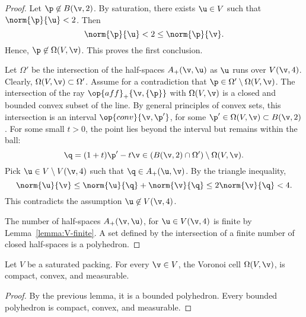 \begin{proof} Let $\p\not\in B(\v,2)$.  
By saturation, there exists $\u\in V$ such that $\norm{\p}{\u}<2$.
Then 
\begin{displaymath}
\norm{\p}{\u} < 2 \le \norm{\p}{\v}.
\end{displaymath}
Hence, $\p\not\in\Omega(V,\v)$.  This proves the first conclusion.


Let $\Omega'$ be the intersection of the half-spaces $A_+(\v,\u)$ as
$\u$ runs over $V(\v,4)$.  Clearly, $\Omega(V,\v)\subset \Omega'$.
Assume for a contradiction that $\p\in \Omega'\setminus\Omega(V,\v)$.
The intersection of the ray $\op{aff}_+\{\v,\{\p\}\}$ with
$\Omega(V,\v)$ is a closed and bounded convex subset of the line.  By
general principles of convex sets, this intersection is an interval
$\op{conv}\{\v,\p'\}$, for some $\p'\in\Omega(V,\v)\subset B(\v,2)$.
For some small $t>0$, the point lies beyond the interval but remains
within the ball:
\begin{displaymath}
\q = (1+t)\p' -t \v\in (B(\v,2)\cap \Omega')\setminus \Omega(V,\v).
\end{displaymath}
Pick $\u\in V\setminus V(\v,4)$ such that $\q\in A_+(\u,\v)$.  By the
triangle inequality,
\begin{displaymath}
\norm{\u}{\v} \le \norm{\u}{\q} + \norm{\v}{\q} \le 2\norm{\v}{\q} < 4.
\end{displaymath}
This contradicts the assumption $\u\not\in V(\v,4)$.

The number of half-spaces $A_+(\v,\u)$, for $\u\in V(\v,4)$ is finite by
Lemma~\ref{lemma:V-finite}.  A set defined by the intersection of a finite number
of closed half-spaces is a polyhedron.
\end{proof}

\begin{lemma}
Let $ V$ be a saturated packing.  For every $\v\in  V$, 
the Voronoi cell $\Omega( V,\v)$,  is
compact, convex, and measurable.
\end{lemma}

\begin{proof}  By the previous lemma, it is a bounded polyhedron.  Every bounded
polyhedron is compact, convex, and measurable.
\end{proof}




